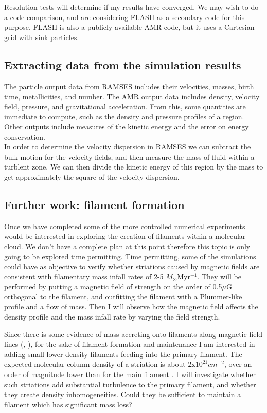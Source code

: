 \documentclass[a4paper,12pt]{article}
\begin{document}
Resolution tests will determine if my results have converged. We may wish to do a code comparison, and are considering FLASH as a secondary code for this purpose. FLASH is also a publicly available AMR code, but it uses a Cartesian grid with sink particles. 

\subsection{Extracting data from the simulation results}

The particle output data from RAMSES includes their velocities, masses, birth time, metallicities, and number. The AMR output data includes density, velocity field, pressure, and gravitational acceleration. From this, some quantities are immediate to compute, such as the density and pressure profiles of a region. Other outputs include measures of the kinetic energy and the error on energy conservation.\\

In order to determine the velocity dispersion in RAMSES we can subtract the bulk motion for the velocity fields, and then measure the mass of fluid within a turblent zone. We can then divide the kinetic energy of this region by the mass to get approximately the square of the velocity dispersion.\\

\subsection{Further work: filament formation}

Once we have completed some of the more controlled numerical experiments would be interested in exploring the creation of filaments within a molecular cloud. We don't have a complete plan at this point therefore this topic is only going to be explored time permitting. Time permitting, some of the simulations could have as objective to verify whether striations caused by magnetic fields are consistent with filamentary mass infall rates of 2-5 $M_{\odot}$Myr$^{-1}$\citep{fri13}. They will be performed by putting a magnetic field of strength on the order of 0.5$\mu$G orthogonal to the filament, and outfitting the filament with a Plummer-like profile and a flow of mass. Then I will observe how the magnetic field affects the density profile and the mass infall rate by varying the field strength.  

Since there is some evidence of mass accreting onto filaments along magnetic field lines (\citep{fri13}, \citep{kir13}), for the sake of filament formation and maintenance I am interested in adding small lower density filaments feeding into the primary filament. The expected molecular column density of a striation is about $2$x$10^{21} cm^{-2}$, over an order of magnitude lower than for the main filament \citep{pal13}. I will investigate whether such striations add substantial turbulence to the primary filament, and whether they create density inhomogeneities. Could they be sufficient to maintain a filament which has significant mass loss?\\
\end{document}
